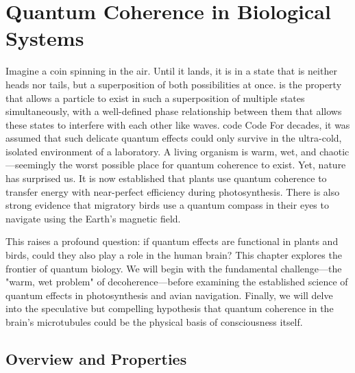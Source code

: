 \chapter{Quantum Coherence in Biological Systems}
\label{ch:quantum-coherence-in-biological-systems}
\begin{nontechnical}
Imagine a coin spinning in the air. Until it lands, it is in a state that is neither heads nor tails, but a superposition of both possibilities at once.  is the property that allows a particle to exist in such a superposition of multiple states simultaneously, with a well-defined phase relationship between them that allows these states to interfere with each other like waves.
code
Code
For decades, it was assumed that such delicate quantum effects could only survive in the ultra-cold, isolated environment of a laboratory. A living organism is warm, wet, and chaotic—seemingly the worst possible place for quantum coherence to exist. Yet, nature has surprised us. It is now established that plants use quantum coherence to transfer energy with near-perfect efficiency during photosynthesis. There is also strong evidence that migratory birds use a quantum compass in their eyes to navigate using the Earth's magnetic field.

This raises a profound question: if quantum effects are functional in plants and birds, could they also play a role in the human brain? This chapter explores the frontier of quantum biology. We will begin with the fundamental challenge—the "warm, wet problem" of decoherence—before examining the established science of quantum effects in photosynthesis and avian navigation. Finally, we will delve into the speculative but compelling hypothesis that quantum coherence in the brain's microtubules could be the physical basis of consciousness itself.
\end{nontechnical}
\section{Overview and Properties}

